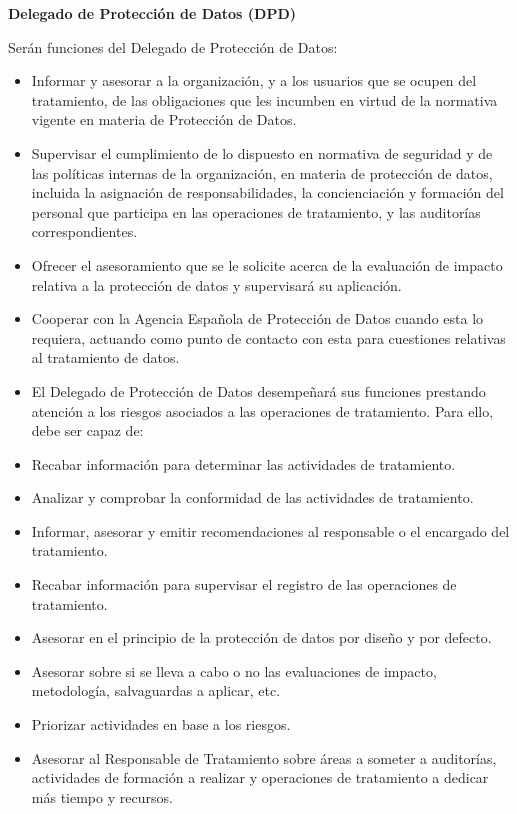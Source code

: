 \begin{enumerate}[label=\alph*)]
\textbf{Delegado de Protección de Datos (DPD)}

Serán funciones del Delegado de Protección de Datos:

\begin{itemize}
    \item Informar y asesorar a la organización, y a los usuarios que se ocupen del tratamiento, de las obligaciones que les incumben en virtud de la normativa vigente en materia de Protección de Datos.
    \item Supervisar el cumplimiento de lo dispuesto en normativa de seguridad y de las políticas internas de la organización, en materia de protección de datos, incluida la asignación de responsabilidades, la concienciación y formación del personal que participa en las operaciones de tratamiento, y las auditorías correspondientes.
    \item Ofrecer el asesoramiento que se le solicite acerca de la evaluación de impacto relativa a la protección de datos y supervisará su aplicación.
    \item Cooperar con la Agencia Española de Protección de Datos cuando esta lo requiera, actuando como punto de contacto con esta para cuestiones relativas al tratamiento de datos.
    \item El Delegado de Protección de Datos desempeñará sus funciones prestando atención a los riesgos asociados a las operaciones de tratamiento. Para ello, debe ser capaz de:
    \item Recabar información para determinar las actividades de tratamiento.
    \item Analizar y comprobar la conformidad de las actividades de tratamiento.
    \item Informar, asesorar y emitir recomendaciones al responsable o el encargado del tratamiento.
    \item Recabar información para supervisar el registro de las operaciones de tratamiento.
    \item Asesorar en el principio de la protección de datos por diseño y por defecto.
    \item Asesorar sobre si se lleva a cabo o no las evaluaciones de impacto, metodología, salvaguardas a aplicar, etc.
    \item Priorizar actividades en base a los riesgos.
    \item Asesorar al Responsable de Tratamiento sobre áreas a someter a auditorías, actividades de formación a realizar y operaciones de tratamiento a dedicar más tiempo y recursos.
\end{itemize}


\end{enumerate}
